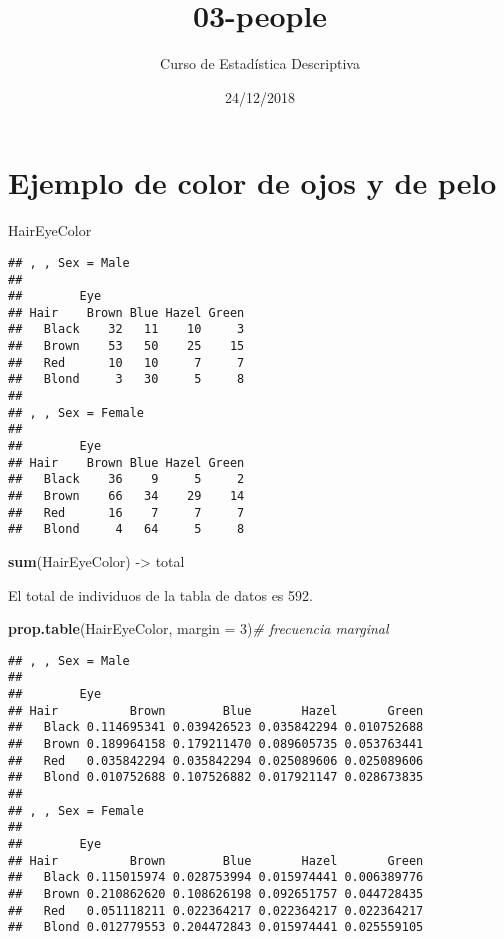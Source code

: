 \documentclass[]{article}
\title{03-people}
\author{Curso de Estadística Descriptiva}
\date{24/12/2018}
\newenvironment{Shaded}{\begin{snugshade}}{\end{snugshade}}
\newcommand{\CommentTok}[1]{\textcolor[rgb]{0.56,0.35,0.01}{\textit{#1}}}
\newcommand{\DataTypeTok}[1]{\textcolor[rgb]{0.13,0.29,0.53}{#1}}
\newcommand{\DecValTok}[1]{\textcolor[rgb]{0.00,0.00,0.81}{#1}}
\newcommand{\KeywordTok}[1]{\textcolor[rgb]{0.13,0.29,0.53}{\textbf{#1}}}
\newcommand{\NormalTok}[1]{#1}
\newcommand{\StringTok}[1]{\textcolor[rgb]{0.31,0.60,0.02}{#1}}
\begin{document}
\maketitle

\hypertarget{ejemplo-de-color-de-ojos-y-de-pelo}{%
\section{Ejemplo de color de ojos y de
pelo}\label{ejemplo-de-color-de-ojos-y-de-pelo}}

\begin{Shaded}
\begin{Highlighting}[]
\NormalTok{HairEyeColor}
\end{Highlighting}
\end{Shaded}

\begin{verbatim}
## , , Sex = Male
## 
##        Eye
## Hair    Brown Blue Hazel Green
##   Black    32   11    10     3
##   Brown    53   50    25    15
##   Red      10   10     7     7
##   Blond     3   30     5     8
## 
## , , Sex = Female
## 
##        Eye
## Hair    Brown Blue Hazel Green
##   Black    36    9     5     2
##   Brown    66   34    29    14
##   Red      16    7     7     7
##   Blond     4   64     5     8
\end{verbatim}

\begin{Shaded}
\begin{Highlighting}[]
\KeywordTok{sum}\NormalTok{(HairEyeColor) ->}\StringTok{ }\NormalTok{total}
\end{Highlighting}
\end{Shaded}

El total de individuos de la tabla de datos es 592.

\begin{Shaded}
\begin{Highlighting}[]
\KeywordTok{prop.table}\NormalTok{(HairEyeColor, }\DataTypeTok{margin =} \DecValTok{3}\NormalTok{)}\CommentTok{# frecuencia marginal}
\end{Highlighting}
\end{Shaded}

\begin{verbatim}
## , , Sex = Male
## 
##        Eye
## Hair          Brown        Blue       Hazel       Green
##   Black 0.114695341 0.039426523 0.035842294 0.010752688
##   Brown 0.189964158 0.179211470 0.089605735 0.053763441
##   Red   0.035842294 0.035842294 0.025089606 0.025089606
##   Blond 0.010752688 0.107526882 0.017921147 0.028673835
## 
## , , Sex = Female
## 
##        Eye
## Hair          Brown        Blue       Hazel       Green
##   Black 0.115015974 0.028753994 0.015974441 0.006389776
##   Brown 0.210862620 0.108626198 0.092651757 0.044728435
##   Red   0.051118211 0.022364217 0.022364217 0.022364217
##   Blond 0.012779553 0.204472843 0.015974441 0.025559105
\end{verbatim}
\end{document}
